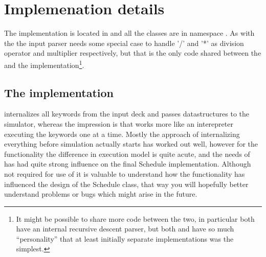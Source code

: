 \section{Implemenation details}
The \actionx{} implementation is located in
 and all the classes are in namespace
. As with the \udq{} the input parser needs some special
case to handle '/' and '*' as division operator and multiplier respectively, but
that is the only code shared between the \udq{} and the \actionx{}
implementation\footnote{It might be possible to share more code between the two,
in particular both have an internal recursive descent parser, but both \udq{}
and \actionx{} have so much ``personality'' that at least initially separate
implementations was the simplest.}.

\subsection*{The  implementation}
\flow{} internalizes all keywords from the input deck and passes datastructures
to the simulator, whereas the impression is that \eclipse{} works more like an
interepreter executing the keywords one at a time. Mostly the \flow{} approach
of internalizing everything before simulation actually starts has worked out
well, however for the \actionx{} functionality the difference in execution model
is quite acute, and the needs of \actionx{} has had quite strong influence on
the final Schedule implementation. Although not required for use of \actionx{}
it is valuable to understand how the \actionx{} functionality has influenced the
design of the Schedule class, that way you will hopefully better understand
problems or bugs which might arise in the future.

